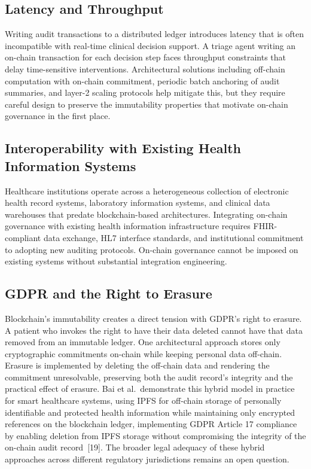 \subsection{Latency and Throughput}\label{latency-and-throughput}

Writing audit transactions to a distributed ledger introduces latency
that is often incompatible with real-time clinical decision support. A
triage agent writing an on-chain transaction for each decision step
faces throughput constraints that delay time-sensitive interventions.
Architectural solutions including off-chain computation with on-chain
commitment, periodic batch anchoring of audit summaries, and layer-2
scaling protocols help mitigate this, but they require careful design to
preserve the immutability properties that motivate on-chain governance
in the first place.

\subsection{Interoperability with Existing Health Information
Systems}\label{interoperability-with-existing-health-information-systems}

Healthcare institutions operate across a heterogeneous collection of
electronic health record systems, laboratory information systems, and
clinical data warehouses that predate blockchain-based architectures.
Integrating on-chain governance with existing health information
infrastructure requires FHIR-compliant data exchange, HL7 interface
standards, and institutional commitment to adopting new auditing
protocols. On-chain governance cannot be imposed on existing systems
without substantial integration engineering.

\subsection{GDPR and the Right to
Erasure}\label{gdpr-and-the-right-to-erasure}

Blockchain's immutability creates a direct tension with GDPR's right to
erasure. A patient who invokes the right to have their data deleted
cannot have that data removed from an immutable ledger. One
architectural approach stores only cryptographic commitments on-chain
while keeping personal data off-chain. Erasure is implemented by
deleting the off-chain data and rendering the commitment unresolvable,
preserving both the audit record's integrity and the practical effect of
erasure. Bai et al.~demonstrate this hybrid model in practice for smart
healthcare systems, using IPFS for off-chain storage of personally
identifiable and protected health information while maintaining only
encrypted references on the blockchain ledger, implementing GDPR Article
17 compliance by enabling deletion from IPFS storage without
compromising the integrity of the on-chain audit record~{[}19{]}. The
broader legal adequacy of these hybrid approaches across different
regulatory jurisdictions remains an open question.


